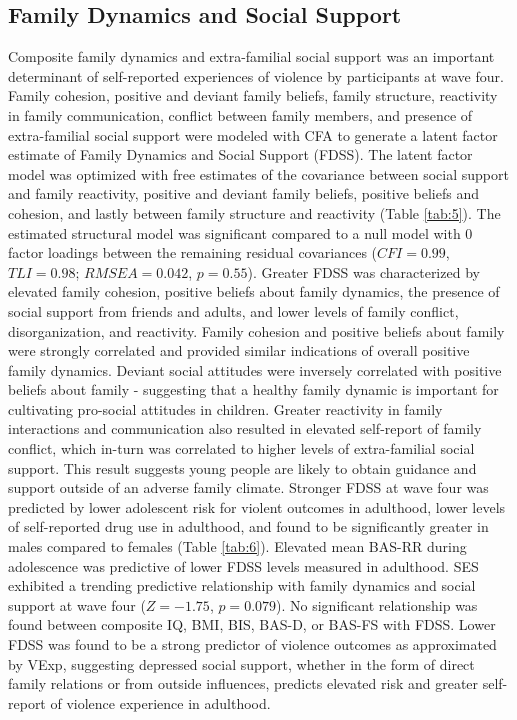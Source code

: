 \documentclass[utf8]{article}
\begin{document}
\subsection*{Family Dynamics and Social Support} Composite family dynamics and extra-familial social support was an important determinant of self-reported experiences of violence by participants at wave four. Family cohesion, positive and deviant family beliefs, family structure, reactivity in family communication, conflict between family members, and presence of extra-familial social support were modeled with CFA to generate a latent factor estimate of Family Dynamics and Social Support (FDSS). The latent factor model was optimized with free estimates of the covariance between social support and family reactivity, positive and deviant family beliefs, positive beliefs and cohesion, and lastly between family structure and reactivity (Table \ref{tab:5}). The estimated structural model was significant compared to a null model with $0$ factor loadings between the remaining residual covariances ($CFI=0.99$, $TLI=0.98$; $RMSEA=0.042$, $p=0.55$). Greater FDSS was characterized by elevated family cohesion, positive beliefs about family dynamics, the presence of social support from friends and adults, and lower levels of family conflict, disorganization, and reactivity. Family cohesion and positive beliefs about family were strongly correlated and provided similar indications of overall positive family dynamics. Deviant social attitudes were inversely correlated with positive beliefs about family  - suggesting that a healthy family dynamic is important for cultivating pro-social attitudes in children. Greater reactivity in family interactions and communication also resulted in elevated self-report of family conflict, which in-turn was correlated to higher levels of extra-familial social support. This result suggests young people are likely to obtain guidance and support outside of an adverse family climate. Stronger FDSS at wave four was predicted by lower adolescent risk for violent outcomes in adulthood, lower levels of self-reported drug use in adulthood, and found to be significantly greater in males compared to females  (Table \ref{tab:6}).  Elevated mean BAS-RR during adolescence was predictive of lower FDSS levels measured in adulthood. SES exhibited a trending predictive relationship with family dynamics and social support at wave four ($Z=-1.75$, $p=0.079$). No significant relationship was found between composite IQ, BMI, BIS, BAS-D, or BAS-FS with FDSS. Lower FDSS was found to be a strong predictor of violence outcomes as approximated by VExp, suggesting depressed social support, whether in the form of direct family relations or from outside influences, predicts elevated risk and greater self-report of violence experience in adulthood.
%
\end{document}
